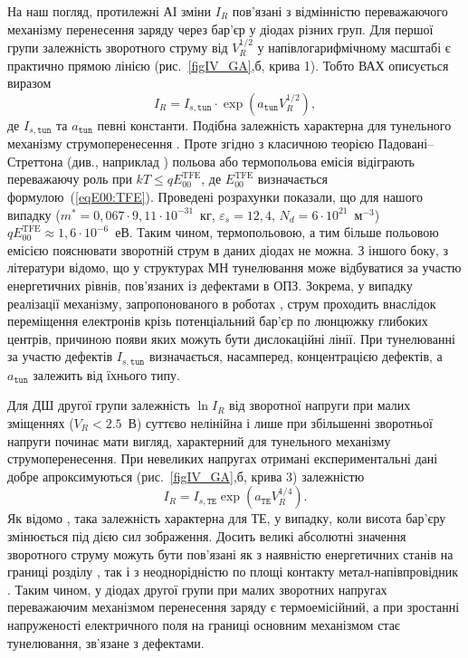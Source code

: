 На наш погляд, протилежні АІ зміни $I_R$ пов’язані з відмінністю переважаючого механізму перенесення заряду через бар'єр у діодах різних груп.
Для першої групи залежність зворотного струму від $V_R^{1/2}$ у напівлогарифмічному масштабі є практично прямою лінією (рис.~\ref{figIV_GA},б, крива 1).
Тобто ВАХ описується виразом
\begin{equation}\label{eqIR1:GA}
I_R=I_{s,\mathtt{tun}}\cdot\exp\left(a_\mathtt{tun}V_R^{1/2}\right),
\end{equation}
де
$I_{s,\mathtt{tun}}$ та $a_\mathtt{tun}$ певні константи.
Подібна залежність характерна для тунельного механізму струмоперенесення \cite{Rhoderick1988}.
Проте згідно з класичною теорією Падовані--Стреттона (див., наприклад \cite{Rhoderick1988,Singh1994}) польова або термопольова емісія відіграють
переважаючу роль при $kT\leq qE_{00}^\mathrm{TFE}$,
де $E_{00}^\mathrm{TFE}$ визначається формулою~(\ref{eqE00:TFE}).
Проведені розрахунки показали, що для нашого випадку ($m^*=0,067\cdot9,11\cdot10^{-31}$~кг,
$\varepsilon_s=12,4$, $N_d=6\cdot10^{21}$~м$^{-3}$) $qE_{00}^\mathrm{TFE}\approx1,6\cdot10^{-6}$~еВ.
Таким чином, термопольовою, а тим більше польовою емісією пояснювати зворотній струм в даних діодах не можна.
З іншого боку, з літератури \cite{Evstropov,Evstropov2000,Ganichev:2000,PipinsFTP,Pipinys1999} відомо, що у структурах МН тунелювання може відбуватися за участю енергетичних рівнів, пов'язаних із дефектами в ОПЗ.
Зокрема, у випадку реалізації механізму, запропонованого в роботах \cite{Evstropov,Evstropov2000}, струм проходить внаслідок переміщення електронів
крізь потенціальний бар'єр по люнцюжку глибоких центрів, причиною появи яких можуть бути дислокаційні лінії.
При тунелюванні за участю дефектів $I_{s,\mathtt{tun}}$ визначається, насамперед, концентрацією дефектів,
а $a_\mathtt{tun}$ залежить від їхнього типу.

Для ДШ другої групи залежність $\ln I_R$ від зворотної напруги при малих зміщеннях ($V_R<2.5$~В) суттєво нелінійна
і лише при збільшенні зворотньої напруги починає мати вигляд, характерний для тунельного механізму струмоперенесення.
При невеликих напругах отримані експериментальні дані добре апроксимуються (рис.~\ref{figIV_GA},б, крива 3) залежністю
\begin{equation}\label{eqIR2:GA}
I_R=I_{s,\mathtt{TE}}\exp\left(a_\mathtt{TE}V_R^{1/4}\right).
\end{equation}
Як відомо \cite{Rhoderick1988},
така залежність характерна для ТЕ, у випадку, коли висота бар’єру змінюється під дією сил зображення.
Досить великі абсолютні значення зворотного струму можуть бути пов’язані як з наявністю енергетичних станів на границі розділу \cite{Singh1994,Tseng1987}, так і з неоднорідністю по площі контакту метал-напівпровідник \cite{Askerov:PhD}.
Таким чином, у діодах другої групи при малих зворотних напругах переважаючим механізмом перенесення заряду є термоемісійний, а при зростанні напруженості електричного поля на границі основним механізмом стає тунелювання, зв'язане з дефектами.

